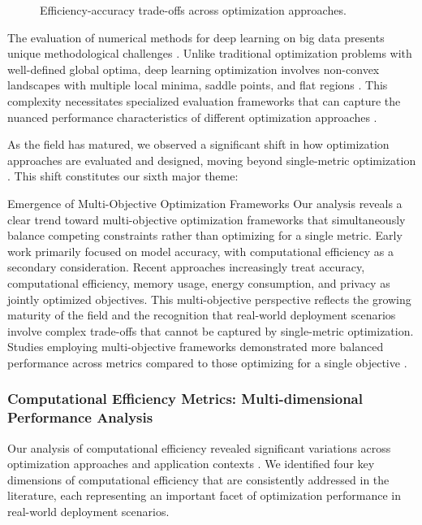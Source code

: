 \documentclass[acmsmall]{acmart}
\begin{document}
\begin{figure}[!htb]
    \caption{Efficiency-accuracy trade-offs across optimization approaches.}
    \label{fig:efficiency_accuracy_tradeoff}
\end{figure}

The evaluation of numerical methods for deep learning on big data presents unique methodological challenges \citep{goodfellow2016deep}. Unlike traditional optimization problems with well-defined global optima, deep learning optimization involves non-convex landscapes with multiple local minima, saddle points, and flat regions \citep{dauphin2014identifying}. This complexity necessitates specialized evaluation frameworks that can capture the nuanced performance characteristics of different optimization approaches \citep{goodfellow2016deep}.

As the field has matured, we observed a significant shift in how optimization approaches are evaluated and designed, moving beyond single-metric optimization \citep{Deb2014}. This shift constitutes our sixth major theme:

\begin{themebox}{Emergence of Multi-Objective Optimization Frameworks}
    Our analysis reveals a clear trend toward multi-objective optimization frameworks that simultaneously balance competing constraints rather than optimizing for a single metric. Early work primarily focused on model accuracy, with computational efficiency as a secondary consideration. Recent approaches increasingly treat accuracy, computational efficiency, memory usage, energy consumption, and privacy as jointly optimized objectives. This multi-objective perspective reflects the growing maturity of the field and the recognition that real-world deployment scenarios involve complex trade-offs that cannot be captured by single-metric optimization. Studies employing multi-objective frameworks demonstrated more balanced performance across metrics compared to those optimizing for a single objective \citep{Deb2014}.
\end{themebox}

\subsubsection{Computational Efficiency Metrics: Multi-dimensional Performance Analysis}\label{subsubsec:performance-analysis-of-numerical-methods-rq12:computational-efficiency-metrics-multi-dimensional-performance-analysis}
Our analysis of computational efficiency revealed significant variations across optimization approaches and application contexts \citep{Wang2021, Kim2022, Lin2022, Park2022}. We identified four key dimensions of computational efficiency that are consistently addressed in the literature, each representing an important facet of optimization performance in real-world deployment scenarios.
\end{document}
